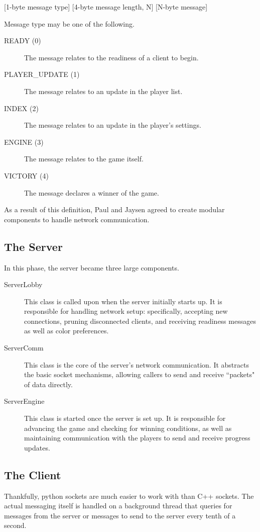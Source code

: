 [1-byte message type] [4-byte message length, N] [N-byte message]

Message type may be one of the following.
\begin{description}
    \item[READY (0)] The message relates to the readiness of a client to begin.
    \item[PLAYER\_UPDATE (1)] The message relates to an update in the player list.
    \item[INDEX (2)] The message relates to an update in the player's settings.
    \item[ENGINE (3)] The message relates to the game itself.
    \item[VICTORY (4)] The message declares a winner of the game.
\end{description}

As a result of this definition, Paul and Jaysen agreed to create modular components
to handle network communication.

\subsection{The Server}
In this phase, the server became three large components.
\begin{description}
    \item[ServerLobby] This class is called upon when the server initially starts
        up. It is responsible for handling network setup: specifically, accepting
        new connections, pruning disconnected clients, and receiving readiness
        messages as well as color preferences.
    \item[ServerComm] This class is the core of the server's network
        communication. It abstracts the basic socket mechanisms, allowing
        callers to send and receive ``packets" of data directly.
    \item[ServerEngine] This class is started once the server is set up. It is
        responsible for advancing the game and checking for winning conditions,
        as well as maintaining communication with the players to send and
        receive progress updates.
\end{description}

\subsection{The Client}
Thankfully, python sockets are much easier to work with than C++ sockets. The actual messaging itself is handled on a background thread that queries for messages from the server or messages to send to the server every tenth of a second.

